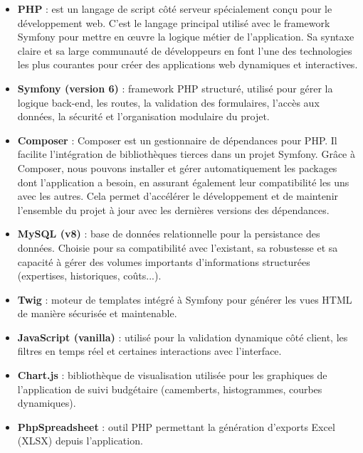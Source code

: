 \documentclass[11pt,a4paper]{article}
\begin{document}
\begin{itemize}

\item \textbf{PHP} : 
est un langage de script côté serveur spécialement conçu pour le développement web. C'est le langage principal utilisé avec le framework Symfony pour mettre en œuvre la logique métier de l'application. Sa syntaxe claire et sa large communauté de développeurs en font l'une des technologies les plus courantes pour créer des applications web dynamiques et interactives.

\item \textbf{Symfony (version 6)} : framework PHP structuré, utilisé pour gérer la logique back-end, les routes, la validation des formulaires, l'accès aux données, la sécurité et l'organisation modulaire du projet.

\item \textbf{Composer } :
Composer est un gestionnaire de dépendances pour PHP. Il facilite l'intégration de bibliothèques tierces dans un projet Symfony. Grâce à Composer, nous pouvons installer et gérer automatiquement les packages dont l'application a besoin, en assurant également leur compatibilité les uns avec les autres. Cela permet d'accélérer le développement et de maintenir l'ensemble du projet à jour avec les dernières versions des dépendances.

\item \textbf{MySQL (v8)} : base de données relationnelle pour la persistance des données. Choisie pour sa compatibilité avec l’existant, sa robustesse et sa capacité à gérer des volumes importants d’informations structurées (expertises, historiques, coûts...).

\item \textbf{Twig} : moteur de templates intégré à Symfony pour générer les vues HTML de manière sécurisée et maintenable.

\item \textbf{JavaScript (vanilla)} : utilisé pour la validation dynamique côté client, les filtres en temps réel et certaines interactions avec l’interface.

\item \textbf{Chart.js} : bibliothèque de visualisation utilisée pour les graphiques de l’application de suivi budgétaire (camemberts, histogrammes, courbes dynamiques).

\item \textbf{PhpSpreadsheet} : outil PHP permettant la génération d’exports Excel (XLSX) depuis l’application.


\end{itemize}
\end{document}
